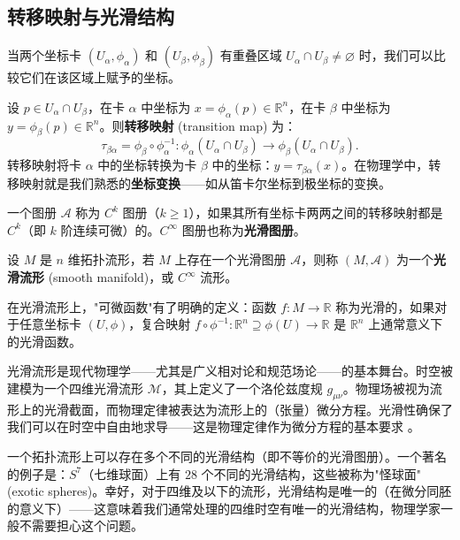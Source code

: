 \subsection{转移映射与光滑结构}

当两个坐标卡 $(U_\alpha, \phi_\alpha)$ 和 $(U_\beta, \phi_\beta)$ 有重叠区域 $U_\alpha \cap U_\beta \neq \varnothing$ 时，我们可以比较它们在该区域上赋予的坐标。

\begin{definition}[转移映射]
设 $p \in U_\alpha \cap U_\beta$，在卡 $\alpha$ 中坐标为 $x = \phi_\alpha(p) \in \mathbb{R}^n$，在卡 $\beta$ 中坐标为 $y = \phi_\beta(p) \in \mathbb{R}^n$。则\textbf{转移映射} (transition map) 为：
\begin{equation}
    \tau_{\beta\alpha} = \phi_\beta \circ \phi_\alpha^{-1}: \phi_\alpha(U_\alpha \cap U_\beta) \to \phi_\beta(U_\alpha \cap U_\beta).
\end{equation}
转移映射将卡 $\alpha$ 中的坐标转换为卡 $\beta$ 中的坐标：$y = \tau_{\beta\alpha}(x)$。在物理学中，转移映射就是我们熟悉的\textbf{坐标变换}——如从笛卡尔坐标到极坐标的变换。
\end{definition}

\begin{definition}[$C^k$ 图册与光滑流形]
一个图册 $\mathcal{A}$ 称为 $C^k$ 图册（$k \geq 1$），如果其所有坐标卡两两之间的转移映射都是 $C^k$（即 $k$ 阶连续可微）的。$C^\infty$ 图册也称为\textbf{光滑图册}。

设 $M$ 是 $n$ 维拓扑流形，若 $M$ 上存在一个光滑图册 $\mathcal{A}$，则称 $(M, \mathcal{A})$ 为一个\textbf{光滑流形} (smooth manifold)，或 $C^\infty$ 流形。
\end{definition}

在光滑流形上，"可微函数"有了明确的定义：函数 $f: M \to \mathbb{R}$ 称为光滑的，如果对于任意坐标卡 $(U, \phi)$，复合映射 $f \circ \phi^{-1}: \mathbb{R}^n \supseteq \phi(U) \to \mathbb{R}$ 是 $\mathbb{R}^n$ 上通常意义下的光滑函数。

\begin{note}[物理意义]
光滑流形是现代物理学——尤其是广义相对论和规范场论——的基本舞台。时空被建模为一个四维光滑流形 $\mathcal{M}$，其上定义了一个洛伦兹度规 $g_{\mu\nu}$。物理场被视为流形上的光滑截面，而物理定律被表达为流形上的（张量）微分方程。光滑性确保了我们可以在时空中自由地求导——这是物理定律作为微分方程的基本要求 \cite{Carroll1997,Reall_Part3_GR}。
\end{note}

\begin{remark}[光滑结构的非唯一性]
一个拓扑流形上可以存在多个不同的光滑结构（即不等价的光滑图册）。一个著名的例子是：$S^7$（七维球面）上有 $28$ 个不同的光滑结构，这些被称为"怪球面" (exotic spheres)。幸好，对于四维及以下的流形，光滑结构是唯一的（在微分同胚的意义下）——这意味着我们通常处理的四维时空有唯一的光滑结构，物理学家一般不需要担心这个问题。
\end{remark}

